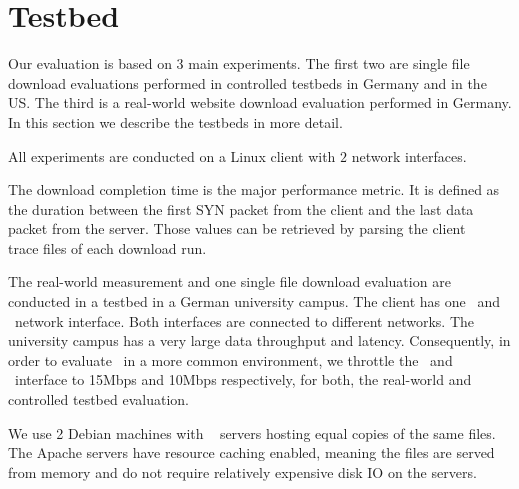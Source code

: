 \section{Testbed}
\label{sec:evaluation-testbed}



Our evaluation is based on 3 main experiments. 
The first two are single file download evaluations performed in controlled testbeds in Germany and in the US. 
The third is a real-world website download evaluation performed in Germany. 
In this section we describe the testbeds in more detail. 

All experiments are conducted on a Linux client with $2$ network interfaces. 

The download completion time is the major performance metric. 
It is defined as the duration between the first SYN packet from the client and the last data packet from the server. 
Those values can be retrieved by parsing the client ~\cite{URL-TCPDUMP} trace files of each download run. 

The real-world measurement and one single file download evaluation are conducted in a testbed in a German university campus. 
The client has one \ethernet~and \wifi~network interface. 
Both interfaces are connected to different networks. 
The university campus has a very large data throughput and latency. 
Consequently, in order to evaluate \mhttp~in a more common environment, we throttle the \ethernet~and \wifi~interface to 15Mbps and 10Mbps respectively, for both, the real-world and controlled testbed evaluation. 

We use 2 Debian machines with ~\cite{URL-APACHE} servers hosting equal copies of the same files. 
The Apache servers have resource caching enabled, meaning the files are served from memory and do not require relatively expensive disk IO on the servers. 

